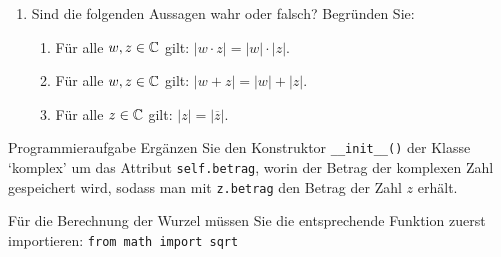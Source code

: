 \begin{ueb}
\begin{enumerate}
\begin{multicols}{2}
\begin{enumerate}
            
            \item $|z+i|\geq 2$
            \begin{center}
        
            \end{center}
            
        \end{enumerate}
        \end{multicols}
        \item Sind die folgenden Aussagen wahr oder falsch? Begründen Sie:

        \begin{enumerate}
            \item Für alle $w,z\in \mathbb{C}$ gilt: $|w\cdot z|=|w|\cdot |z|$.
            \vfill
            \item Für alle $w,z\in \mathbb{C}$ gilt: $|w + z|=|w|+|z|$.
            \vfill
            \item Für alle $z\in \mathbb{C}$ gilt: $|z|=|\overline{z}|$.
            \vfill
        \end{enumerate}
        
    \end{enumerate}
\end{ueb}


\begin{ueb}
    {Programmieraufgabe}{}
    Ergänzen Sie den Konstruktor \lstinline{__init__()} der Klasse `komplex' um das Attribut \lstinline{self.betrag}, worin der Betrag der komplexen Zahl gespeichert wird, sodass man mit \lstinline{z.betrag} den Betrag der Zahl $z$ erhält.



    Für die Berechnung der Wurzel müssen Sie die entsprechende Funktion zuerst importieren: \lstinline{from math import sqrt}
\end{ueb}



